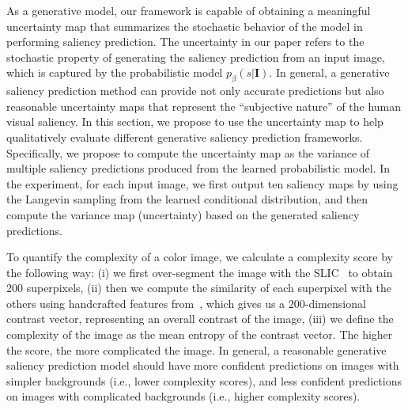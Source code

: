 \documentclass{article}
\begin{document}
As a generative model, our framework is capable of obtaining a meaningful uncertainty map that summarizes the stochastic behavior of the model in performing saliency prediction. The uncertainty in our paper refers to the stochastic property of generating the saliency prediction from an input image, which is captured by the probabilistic model $p_{\beta}(s|\textbf{I})$.
In general, a generative saliency prediction method can provide not only accurate predictions but also reasonable uncertainty maps that  represent the “subjective nature” of the human visual saliency. In this section, we propose to use the uncertainty map to help qualitatively evaluate different generative saliency prediction frameworks. Specifically, we propose to compute the uncertainty map as the variance of multiple saliency predictions produced from the learned probabilistic model. In the experiment, for each input image, we first output ten saliency maps by using the Langevin sampling from the learned conditional distribution, and then compute the variance map (uncertainty) based on the generated saliency predictions.


To quantify the complexity of a color image, we calculate a complexity score by the following way: (i) we first over-segment the image with the SLIC~\cite{slic} to obtain $200$ superpixels, (ii) then we compute the similarity of each superpixel with the others using handcrafted features from~\cite{rbd_sal}, which gives us a $200$-dimensional contrast vector, representing an overall contrast of the image, (iii) we define the complexity of the image as the mean entropy of the contrast vector. The higher the score, the more complicated the image. In general, a reasonable generative saliency prediction model should have more confident predictions on images with simpler backgrounds (i.e., lower complexity scores), and less confident predictions on images with complicated backgrounds (i.e., higher complexity scores). 
\end{document}
